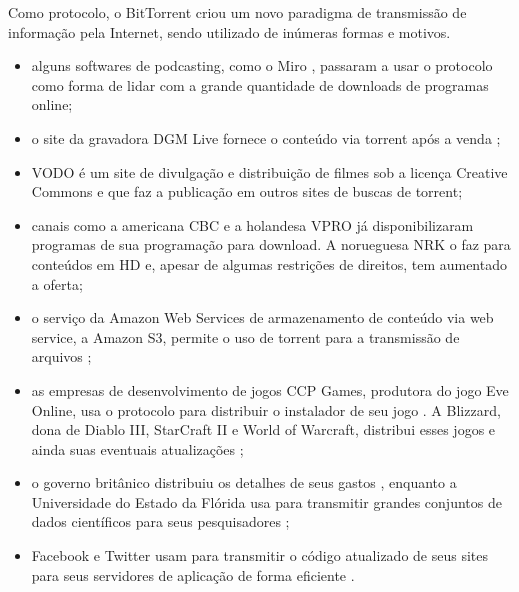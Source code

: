 Como protocolo, o BitTorrent criou um novo paradigma de transmissão de informação pela
Internet, sendo utilizado de inúmeras formas e motivos.

\begin{itemize}
    \item alguns softwares de podcasting, como o Miro \cite{site:miro}, passaram a
        usar o protocolo como forma de lidar com a grande quantidade de downloads de
        programas online;

    \item o site da gravadora DGM Live fornece o conteúdo via torrent após a venda
        \cite{site:dgm};

    \item VODO \cite{site:vodo} é um site de divulgação e distribuição de filmes sob a
        licença Creative Commons e que faz a publicação em outros sites de buscas de
        torrent;

    \item canais como a americana CBC \cite{site:cbc} e a holandesa VPRO
        \cite{site:vpro} já disponibilizaram programas de sua programação para
        download. A norueguesa NRK o faz para conteúdos em HD \cite{site:nrk} e,
        apesar de algumas restrições de direitos, tem aumentado a oferta;

    \item o serviço da Amazon Web Services de armazenamento de conteúdo via web service,
        a Amazon S3, permite o uso de torrent para a transmissão de arquivos
        \cite{site:aws-s3};

    \item as empresas de desenvolvimento de jogos CCP Games, produtora do jogo Eve
        Online, usa o protocolo para distribuir o instalador de seu jogo
        \cite{site:eve}. A Blizzard, dona de Diablo III, StarCraft II e World of
        Warcraft, distribui esses jogos e ainda suas eventuais atualizações
        \cite{site:blizzard};

    \item o governo britânico distribuiu os detalhes de seus gastos \cite{site:gov-uk},
        enquanto a Universidade do Estado da Flórida usa para transmitir grandes
        conjuntos de dados científicos para seus pesquisadores \cite{site:univ-fl};

    \item Facebook \cite{site:facebook-torrent} e Twitter \cite{site:twitter-torrent}
        usam para transmitir o código atualizado de seus sites para seus servidores de
        aplicação de forma eficiente \cite{site:twitter-torrent-power}.
\end{itemize}

